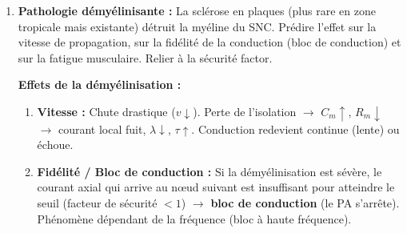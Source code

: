 \documentclass[11pt]{article}
\begin{document}
\begin{exercice}
\begin{enumerate}
\begin{center}
\end{center}
\par \textbf{Explication :} Au nœud $n$ (actif, dépolarisé $+30\,\text{mV}$), l'entrée massive de $\text{Na}^+$ crée un courant axial ($I_{\text{axo}}$) vers le nœud $n+1$ (au repos, $-70\,\text{mV}$). Ce courant traverse l'axoplasme (faible $R_i$ grâce au gros diamètre) et sort par la capacité/résistance du nœud $n+1$ (boucle de courant local $I_{\text{local}}$). Comme la myéline isole parfaitement l'internœud ($R_m \uparrow \uparrow, C_m \downarrow \downarrow$), \textbf{aucun courant ne fuit} latéralement. Tout le courant axial arrive intact au nœud suivant, le dépolarisant fortement jusqu'au seuil. Le PA « saute » ainsi d'un nœud à l'autre sans se propager continûment.
\par \textbf{Accélération :} Le temps de propagation est le temps de charge de la capacité du nœud suivant ($\tau_{\text{nœud}} = R_m^{\text{nœud}} C_m^{\text{nœud}}$), très court car surface nœudale petite. L'internœud est traversé quasi-instantanément par le courant axial (vitesse $\sim c/100$).
\item \textbf{Pathologie démyélinisante :} La sclérose en plaques (plus rare en zone tropicale mais existante) détruit la myéline du SNC. Prédire l'effet sur la vitesse de propagation, sur la fidélité de la conduction (bloc de conduction) et sur la fatigue musculaire. Relier à la sécurité factor.
\par \textbf{Effets de la démyélinisation :}
\begin{enumerate}
\item \textbf{Vitesse :} Chute drastique ($v \downarrow$). Perte de l'isolation $\to$ $C_m \uparrow$, $R_m \downarrow$ $\to$ courant local fuit, $\lambda \downarrow$, $\tau \uparrow$. Conduction redevient continue (lente) ou échoue.
\item \textbf{Fidélité / Bloc de conduction :} Si la démyélinisation est sévère, le courant axial qui arrive au nœud suivant est insuffisant pour atteindre le seuil (facteur de sécurité $< 1$) $\to$ \textbf{bloc de conduction} (le PA s'arrête). Phénomène dépendant de la fréquence (bloc à haute fréquence).

\end{enumerate}
\end{enumerate}
\end{exercice}
\end{document}
